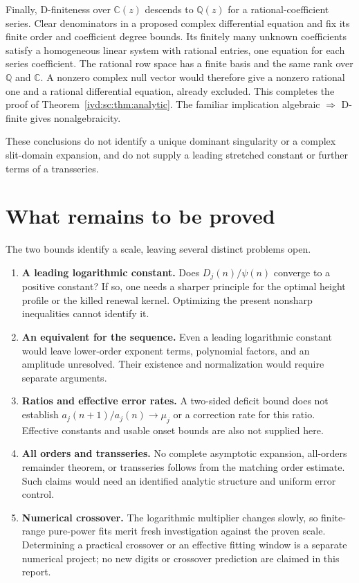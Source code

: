 \documentclass[11pt,letterpaper]{article}
\theoremstyle{remark}\newtheorem{remark}[theorem]{Remark}
\numberwithin{equation}{section}
\begin{document}
Finally, D-finiteness over $\mathbb C(z)$ descends to $\mathbb Q(z)$
for a rational-coefficient series. Clear denominators in a proposed
complex differential equation and fix its finite order and coefficient
degree bounds. Its finitely many unknown coefficients satisfy a
homogeneous linear system with rational entries, one equation for each
series coefficient. The rational row space has a finite basis and the
same rank over $\mathbb Q$ and $\mathbb C$. A nonzero complex null
vector would therefore give a nonzero rational one and a rational
differential equation, already excluded. This completes the proof of
Theorem~\ref{ivd:sc:thm:analytic}. The familiar implication algebraic
$\Rightarrow$ D-finite gives nonalgebraicity.

These conclusions do not identify a unique dominant singularity or a
complex slit-domain expansion, and do not supply a leading stretched
constant or further terms of a transseries.

\section{What remains to be proved}\label{ivd:sc:sec:remains}
The two bounds identify a scale, leaving several distinct problems open.
\begin{enumerate}
\item \textbf{A leading logarithmic constant.} Does
$D_j(n)/\psi(n)$ converge to a positive constant? If so, one needs a
sharper principle for the optimal height profile or the killed renewal
kernel. Optimizing the present nonsharp inequalities cannot identify it.
\item \textbf{An equivalent for the sequence.} Even a leading
logarithmic constant would leave lower-order exponent terms, polynomial
factors, and an amplitude unresolved. Their existence and normalization
would require separate arguments.
\item \textbf{Ratios and effective error rates.} A two-sided deficit
bound does not establish $a_j(n+1)/a_j(n)\to\mu_j$ or a correction
rate for this ratio. Effective constants and usable onset bounds are
also not supplied here.
\item \textbf{All orders and transseries.} No complete asymptotic
expansion, all-orders remainder theorem, or transseries follows from
the matching order estimate. Such claims would need an identified
analytic structure and uniform error control.
\item \textbf{Numerical crossover.} The logarithmic multiplier changes
slowly, so finite-range pure-power fits merit fresh investigation against
the proven scale. Determining a practical crossover or an effective
fitting window is a separate numerical project; no new digits or
crossover prediction are claimed in this report.
\end{enumerate}
\end{document}
